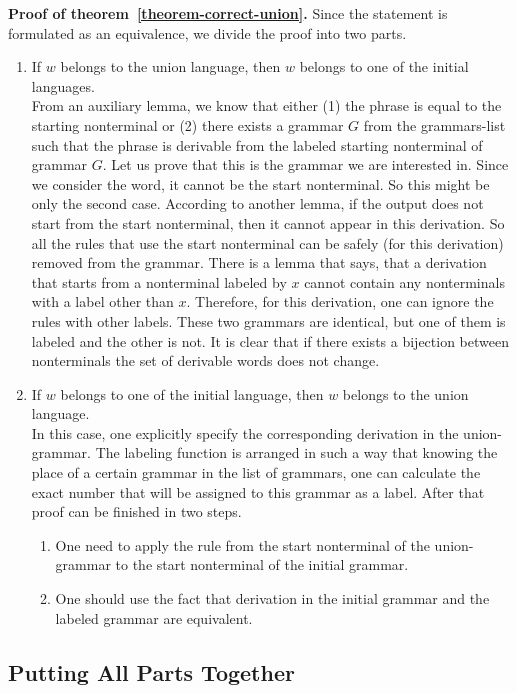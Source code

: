 \textbf{Proof of theorem~\ref{theorem-correct-union}.} Since the statement is formulated as an equivalence, we divide the proof into two parts.
\begin{enumerate}
\item If $w$ belongs to the union language, then $w$ belongs to one of the initial languages. \\
From an auxiliary lemma, we know that either (1) the phrase is equal to the starting nonterminal or (2) there exists a grammar $G$ from the grammars-list such that the phrase is derivable from the labeled starting nonterminal of grammar $G$.
Let us prove that this is the grammar we are interested in.
Since we consider the word, it cannot be the start nonterminal. So this might be only the second case.
According to another lemma, if the output does not start from the start nonterminal, then it cannot appear in this derivation. So all the rules that use the start nonterminal can be safely (for this derivation) removed from the grammar.
There is a lemma that says, that a derivation that starts from a nonterminal labeled by $x$ cannot contain any nonterminals with a label other than $x$. Therefore, for this derivation, one can ignore the rules with other labels.
These two grammars are identical, but one of them is labeled and the other is not. It is clear that if there exists a bijection between nonterminals the set of derivable words does not change.

\item If $w$ belongs to one of the initial language, then $w$ belongs to the union language. \\
In this case, one explicitly specify the corresponding derivation in the union-grammar.
The labeling function is arranged in such a way that knowing the place of a certain grammar in the list of grammars, one can calculate the exact number that will be assigned to this grammar as a label.
After that proof can be finished in two steps. 
\begin{enumerate}
\item One need to apply the rule from the start nonterminal of the union-grammar to the start nonterminal of the initial grammar. 
\item One should use the fact that derivation in the initial grammar and the labeled grammar are equivalent.
\end{enumerate}
\end{enumerate}

\subsection{Putting All Parts Together}

